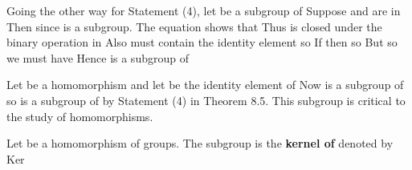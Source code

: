\documentclass[11pt,oneside]{article}
\begin{document}
\begin{BookBody}
Going the other way for Statement (4), let  be a subgroup of  Suppose  and  are in  Then  since  is a subgroup. The equation   shows that  Thus  is closed under the binary operation in  Also must contain the identity element  so  If  then  so  But  so we must have  Hence  is a subgroup of \BookEnd{\blacklozenge}

Let  be a homomorphism and let  be the identity element of  Now  is a subgroup of  so  is a subgroup  of  by Statement (4) in Theorem 8.5. This subgroup is critical to the study of homomorphisms.

 Let  be a homomorphism of groups. The subgroup   is the\textbf{ kernel of} \BookInline{\phi,\allowbreak } denoted by Ker\BookEnd{\blacksquare}

\end{BookBody}

\BookNarrativetrue
\end{document}
